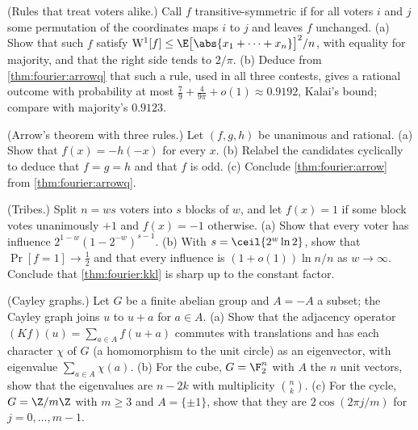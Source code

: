 \begin{refsection}
\begin{exercises}
\item \consolidation\hard (Rules that treat voters alike.) Call $f$ transitive-symmetric if for all voters $i$ and $j$ some permutation of the coordinates maps $i$ to $j$ and leaves $f$ unchanged. (a) Show that such $f$ satisfy $\fourierW1[f]\le\E\bigl[\abs{x_1+\dots+x_n}\bigr]^2/n$, with equality for majority, and that the right side tends to $2/\pi$. (b) Deduce from \cref{thm:fourier:arrowq} that such a rule, used in all three contests, gives a rational outcome with probability at most $\frac79+\frac4{9\pi}+o(1)\approx0.9192$, Kalai's bound; compare with majority's $0.9123$. \label{ex:fourier:symmetric}

\item \consolidation\hard (Arrow's theorem with three rules.) Let $(f,g,h)$ be unanimous and rational. (a) Show that $f(x)=-h(-x)$ for every $x$. (b) Relabel the candidates cyclically to deduce that $f=g=h$ and that $f$ is odd. (c) Conclude \cref{thm:fourier:arrow} from \cref{thm:fourier:arrowq}. \label{ex:fourier:neutral}

\item \consolidation (Tribes.) Split $n=ws$ voters into $s$ blocks of $w$, and let $f(x)=1$ if some block votes unanimously $+1$ and $f(x)=-1$ otherwise. (a) Show that every voter has influence $2^{1-w}(1-2^{-w})^{s-1}$. (b) With $s=\ceil{2^w\ln2}$, show that $\Pr[f=1]\to\frac12$ and that every influence is $(1+o(1))\ln n/n$ as $w\to\infty$. Conclude that \cref{thm:fourier:kkl} is sharp up to the constant factor.\label{ex:fourier:tribes}

\item \transfer (Cayley graphs.) Let $G$ be a finite abelian group and $A=-A$ a subset; the Cayley graph joins $u$ to $u+a$ for $a\in A$. (a) Show that the adjacency operator $(Kf)(u)=\sum_{a\in A}f(u+a)$ commutes with translations and has each character $\chi$ of $G$ (a homomorphism to the unit circle) as an eigenvector, with eigenvalue $\sum_{a\in A}\chi(a)$. (b) For the cube, $G=\F_2^n$ with $A$ the $n$ unit vectors, show that the eigenvalues are $n-2k$ with multiplicity $\binom nk$. (c) For the cycle, $G=\Z/m\Z$ with $m\ge3$ and $A=\{\pm1\}$, show that they are $2\cos(2\pi j/m)$ for $j=0,\dots,m-1$.\label{ex:fourier:cayley}


\end{exercises}
\end{refsection}
